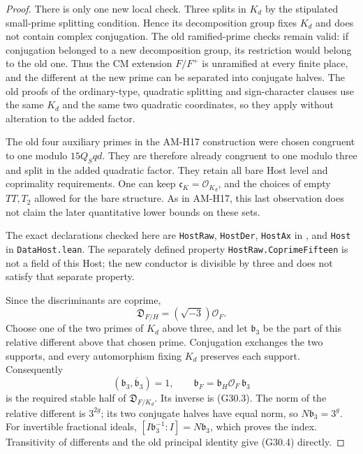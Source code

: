 \begin{proof}
There is only one new local check.  Three splits in $K_d$
by the stipulated small-prime splitting condition.  Hence
its decomposition group fixes $K_d$ and does not contain
complex conjugation.  The old ramified-prime checks remain
valid: if conjugation belonged to a new decomposition
group, its restriction would belong to the old one.
Thus the CM extension $F/F^+$ is unramified at every finite
place, and the different at the new prime can be separated
into conjugate halves.  The old proofs of the ordinary-type,
quadratic splitting and sign-character clauses use the same
$K_d$ and the same two quadratic coordinates, so they apply
without alteration to the added factor.

The old four auxiliary primes in the AM-H17 construction
were chosen congruent to one modulo $15Q_Sqd$.
They are therefore already congruent to one modulo three
and split in the added quadratic factor.  They retain all
bare Host level and coprimality requirements.  One can keep
$\mathfrak c_K=\mathcal O_{K_d}$, and the choices of empty
$TT,T_2$ allowed for the bare structure.  As in AM-H17, this
last observation does not claim the later quantitative
lower bounds on these sets.

The exact declarations checked here are
\texttt{HostRaw}, \texttt{HostDer}, \texttt{HostAx} in
,
and \texttt{Host} in \texttt{DataHost.lean}.
The separately defined property
\texttt{HostRaw.CoprimeFifteen} is not a field of this Host;
the new conductor is divisible by three and does not satisfy
that separate property.

Since the discriminants are coprime,
\[
 \mathfrak D_{F/H}=(\sqrt{-3})\mathcal O_F.
\]
Choose one of the two primes of $K_d$ above three, and let
$\mathfrak b_3$ be the part of this relative different above
that chosen prime.  Conjugation exchanges the two supports,
and every automorphism fixing $K_d$ preserves each support.
Consequently
\[
 (\mathfrak b_3,\overline{\mathfrak b}_3)=1,
 \qquad
 \mathfrak b_F=\mathfrak b_H\mathcal O_F\,\mathfrak b_3
\]
is the required stable half of $\mathfrak D_{F/K_d}$.
Its inverse is (G30.3).  The norm of the relative different
is $3^{2g}$; its two conjugate halves have equal norm, so
$N\mathfrak b_3=3^g$.  For invertible fractional ideals,
$[I\mathfrak b_3^{-1}:I]=N\mathfrak b_3$, which proves
the index.  Transitivity of differents and the old principal
identity give (G30.4) directly.


\end{proof}
